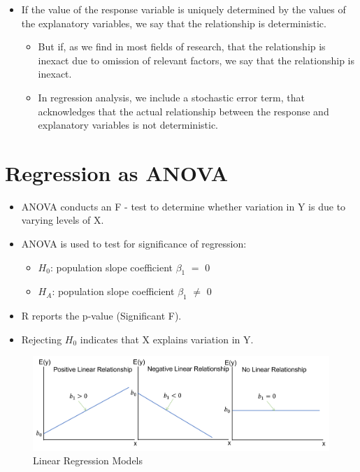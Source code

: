 \documentclass[
  letterpaper,
  DIV=11,
  numbers=noendperiod]{scrreprt}
\providecommand{\tightlist}{%
  \setlength{\itemsep}{0pt}\setlength{\parskip}{0pt}}\usepackage{longtable,booktabs,array}
\begin{document}
\begin{itemize}
\tightlist
\item
  If the value of the response variable is uniquely determined by the
  values of the explanatory variables, we say that the relationship is
  deterministic.

  \begin{itemize}
  \tightlist
  \item
    But if, as we find in most fields of research, that the relationship
    is inexact due to omission of relevant factors, we say that the
    relationship is inexact.
  \item
    In regression analysis, we include a stochastic error term, that
    acknowledges that the actual relationship between the response and
    explanatory variables is not deterministic.
  \end{itemize}
\end{itemize}

\section{Regression as ANOVA}\label{regression-as-anova}

\begin{itemize}
\tightlist
\item
  ANOVA conducts an F - test to determine whether variation in Y is due
  to varying levels of X.
\item
  ANOVA is used to test for significance of regression:

  \begin{itemize}
  \tightlist
  \item
    \(H_0\): population slope coefficient \(\beta_1\) \(=\) 0
  \item
    \(H_A\): population slope coefficient \(\beta_1\) \(\neq\) 0
  \end{itemize}
\item
  R reports the p-value (Significant F).
\item
  Rejecting \(H_0\) indicates that X explains variation in Y.
\end{itemize}

\begin{figure}[H]

{\centering \includegraphics{Pictures/Ch9/LinearReg.png}

}

\caption{Linear Regression Models}

\end{figure}%
\end{document}
